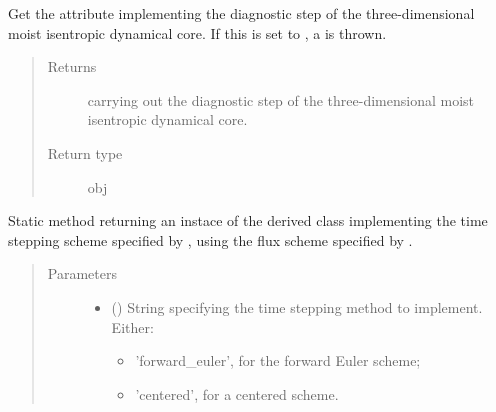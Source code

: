 \documentclass[letterpaper,10pt,english]{sphinxmanual}
\begin{document}
\begin{fulllineitems}
\begin{fulllineitems}
\label{\detokenize{api:dycore.prognostic_isentropic.PrognosticIsentropic.diagnostic}}
Get the attribute implementing the diagnostic step of the three-dimensional moist isentropic dynamical core.
If this is set to , a  is thrown.
\begin{quote}\begin{description}
\item[{Returns}] \leavevmode
{\hyperref[\detokenize{api:dycore.diagnostic_isentropic.DiagnosticIsentropic}]{}} carrying out the diagnostic step of the
three-dimensional moist isentropic dynamical core.

\item[{Return type}] \leavevmode
obj

\end{description}\end{quote}

\end{fulllineitems}


\begin{fulllineitems}
\label{\detokenize{api:dycore.prognostic_isentropic.PrognosticIsentropic.factory}}
Static method returning an instace of the derived class implementing the time stepping scheme specified
by , using the flux scheme specified by .
\begin{quote}\begin{description}
\item[{Parameters}] \leavevmode\begin{itemize}
\item {} 
 () \textendash{} 
String specifying the time stepping method to implement. Either:
\begin{itemize}
\item {} 
’forward\_euler’, for the forward Euler scheme;

\item {} 
’centered’, for a centered scheme.


\end{itemize}
\end{itemize}
\end{description}
\end{quote}
\end{fulllineitems}
\end{fulllineitems}
\end{document}
